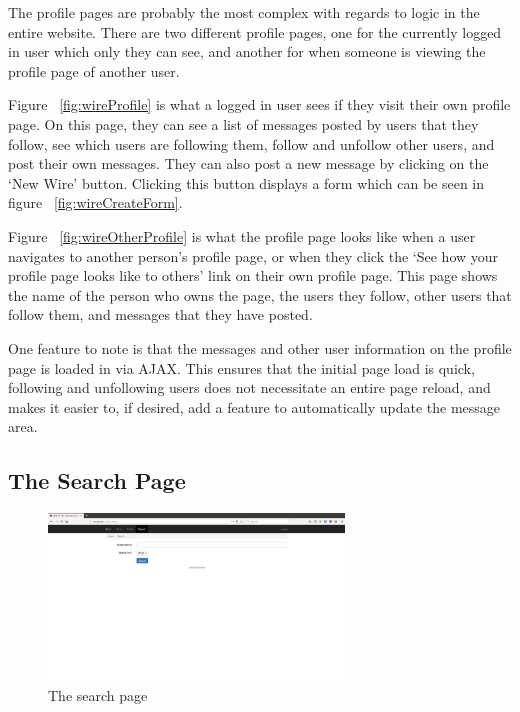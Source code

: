 The profile pages are probably the most complex with regards to logic in the
entire website. There are two different profile pages, one for the currently
logged in user which only they can see, and another for when someone is
viewing the profile page of another user.

Figure ~\ref{fig:wireProfile} is what a logged in user sees if they visit
their own profile page. On this page, they can see a list of messages posted
by users that they follow, see which users are following them, follow and
unfollow other users, and post their own messages. They can also post a
new message by clicking on the `New Wire' button. Clicking this button
displays a form which can be seen in figure ~\ref{fig:wireCreateForm}.

Figure ~\ref{fig:wireOtherProfile} is what the profile page looks like
when a user navigates to another person's profile page, or when they click
the `See how your profile page looks like to others' link on their own
profile page. This page shows the name of the person who owns the page,
the users they follow, other users that follow them, and messages that
they have posted.

One feature to note is that the messages and other user information on
the profile page is loaded in via AJAX. This ensures that the initial
page load is quick, following and unfollowing users does not necessitate
an entire page reload, and makes it easier to, if desired, add a feature
to automatically update the message area.

\subsection{The Search Page}

\begin{figure}[H]
	\centering
	\includegraphics[width=0.7\textwidth]{final_report/pics/searchBase.png}
	\caption{The search page}
	\label{fig:wireSearch}
\end{figure}

